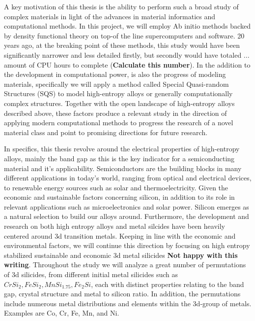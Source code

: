 \documentclass[UKenglish]{ifimaster}  %
\begin{document}
A key motivation of this thesis is the ability to perform such a broad study of complex materials in light of the advances in material informatics and computational methods. In this project, we will employ Ab initio methods backed by density functional theory on top-of the line supercomputers and software. 20 years ago, at the breaking point of these methods, this study would have been significantly narrower and less detailed firstly, but secondly would have totaled ... amount of CPU hours to complete (\textbf{Calculate this number}). In the addition to the development in computational power, is also the progress of modeling materials, specifically we will apply a method called Special Quasi-random Structures (SQS) to model high-entropy alloys or generally computationally complex structures. Together with the open landscape of high-entropy alloys described above, these factors produce a relevant study in the direction of applying modern computational methods to progress the research of a novel material class and point to promising directions for future research.   
 
In specifics, this thesis revolve around the electrical properties of high-entropy alloys, mainly the band gap as this is the key indicator for a semiconducting material and it's applicability. Semiconductors are the building blocks in many different applications in today's world, ranging from  optical and electrical devices, to renewable energy sources such as solar and thermoelectricity. Given the economic and sustainable factors concerning silicon, in addition to its role in relevant applications such as microelectronics and solar power. Silicon emerges as a natural selection to build our alloys around. Furthermore, the development and research on both high entropy alloys and metal silcides have been heavily centered around 3d transition metals. Keeping in line with the economic and environmental factors, we will continue this direction by focusing on high entropy stabilized sustainable and economic 3d metal silicides \textbf{Not happy with this writing}. Throughout the study we will analyze a great number of permutations of 3d silicides, from different initial metal silicides such as $CrSi_2, FeSi_2, MnSi_{1.75}, Fe_2Si$, each with distinct properties relating to the band gap, crystal structure and metal to silicon ratio. In addition, the permutations include numerous metal distributions and elements within the 3d-group of metals. Examples are Co, Cr, Fe, Mn, and Ni. 
\end{document}

